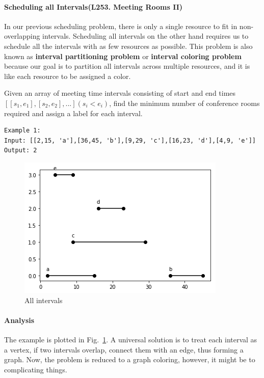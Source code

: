 \documentclass[../main.tex]{subfiles}
\begin{document}
\paragraph{Scheduling all Intervals(L253. Meeting Rooms II)} In our previous scheduling problem, there is only a single resource to fit in non-overlapping intervals. Scheduling all intervals on the other hand requires us to schedule all the intervals with as few resources as possible. This problem is also known as \textbf{interval partitioning problem} or \textbf{interval coloring problem} because our goal is to partition all intervals across multiple resources, and it is like each resource to be assigned a color.

Given an array of meeting time intervals consisting of start and end times $[[s_1,e_1],[s_2,e_2],...] (s_i < e_i)$, find the minimum number of conference rooms required and assign a label for each interval. 
\begin{lstlisting}[numbers=none]
Example 1:
Input: [[2,15, 'a'],[36,45, 'b'],[9,29, 'c'],[16,23, 'd'],[4,9, 'e']] 
Output: 2
\end{lstlisting}
\begin{figure}[H]
    \centering
    \includegraphics[width=0.7\columnwidth]{fig/greedy_schedule_all_intervals_1.png}
    \caption{All intervals}
    \label{fig:greedy_intervals}
\end{figure}
\paragraph{Analysis} The example is plotted in Fig.~\ref{fig:greedy_intervals}. A universal solution is to treat each interval as a vertex, if two intervals overlap, connect them with an edge, thus forming a graph. Now, the problem is reduced to a graph coloring, however, it might be to complicating things. 
\end{document}
